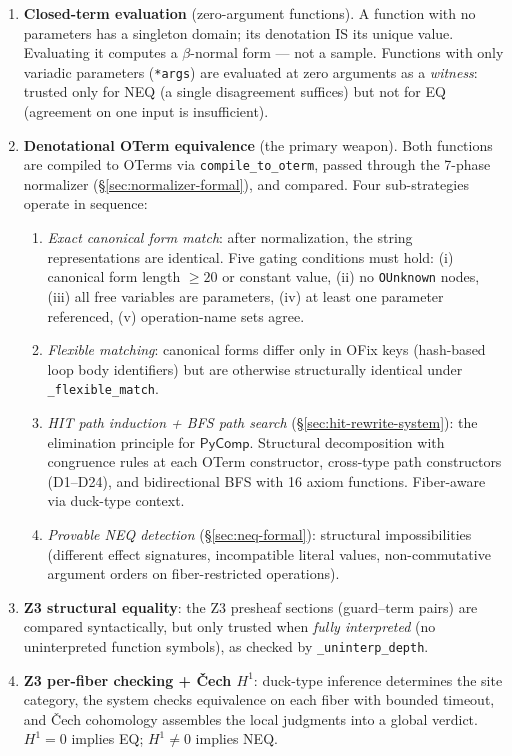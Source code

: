\documentclass[11pt,a4paper]{report}
\theoremstyle{definition}
\theoremstyle{plain}
\begin{document}
\begin{enumerate}
  \item[\textbf{$\pi_0$}:] \textbf{Closed-term evaluation}
    (zero-argument functions).
    A function with no parameters has a singleton domain; its
    denotation IS its unique value.  Evaluating it computes
    a $\beta$-normal form --- not a sample.  Functions with only
    variadic parameters (\texttt{*args}) are evaluated at zero
    arguments as a \emph{witness}: trusted only for NEQ (a single
    disagreement suffices) but not for EQ (agreement on one input
    is insufficient).

  \item[\textbf{$\pi_1$}:] \textbf{Denotational OTerm equivalence}
    (the primary weapon).  Both functions are compiled to OTerms
    via \texttt{compile\_to\_oterm}, passed through the 7-phase
    normalizer (\S\ref{sec:normalizer-formal}), and compared.
    Four sub-strategies operate in sequence:
    \begin{enumerate}[label=(\alph*)]
      \item \emph{Exact canonical form match}: after normalization,
        the string representations are identical.  Five gating
        conditions must hold: (i) canonical form length $\geq 20$
        or constant value, (ii) no \texttt{OUnknown} nodes, (iii)
        all free variables are parameters, (iv) at least one
        parameter referenced, (v) operation-name sets agree.
      \item \emph{Flexible matching}: canonical forms differ only
        in OFix keys (hash-based loop body identifiers) but are
        otherwise structurally identical under
        \texttt{\_flexible\_match}.
      \item \emph{HIT path induction + BFS path search}
        (\S\ref{sec:hit-rewrite-system}): the elimination
        principle for $\mathsf{PyComp}$.  Structural decomposition
        with congruence rules at each OTerm constructor, cross-type
        path constructors (D1--D24), and bidirectional BFS with
        16 axiom functions.  Fiber-aware via duck-type context.
      \item \emph{Provable NEQ detection}
        (\S\ref{sec:neq-formal}): structural impossibilities
        (different effect signatures, incompatible literal values,
        non-commutative argument orders on fiber-restricted
        operations).
    \end{enumerate}

  \item[\textbf{$\pi_2$}:] \textbf{Z3 structural equality}: the
    Z3 presheaf sections (guard--term pairs) are compared
    syntactically, but only trusted when \emph{fully interpreted}
    (no uninterpreted function symbols), as checked by
    \texttt{\_uninterp\_depth}.

  \item[\textbf{$\pi_3$}:] \textbf{Z3 per-fiber checking +
    \v{C}ech $H^1$}: duck-type inference determines the site
    category, the system checks equivalence on each fiber with
    bounded timeout, and \v{C}ech cohomology assembles the local
    judgments into a global verdict.  $H^1 = 0$ implies EQ;
    $H^1 \neq 0$ implies NEQ.
\end{enumerate}
\end{document}
